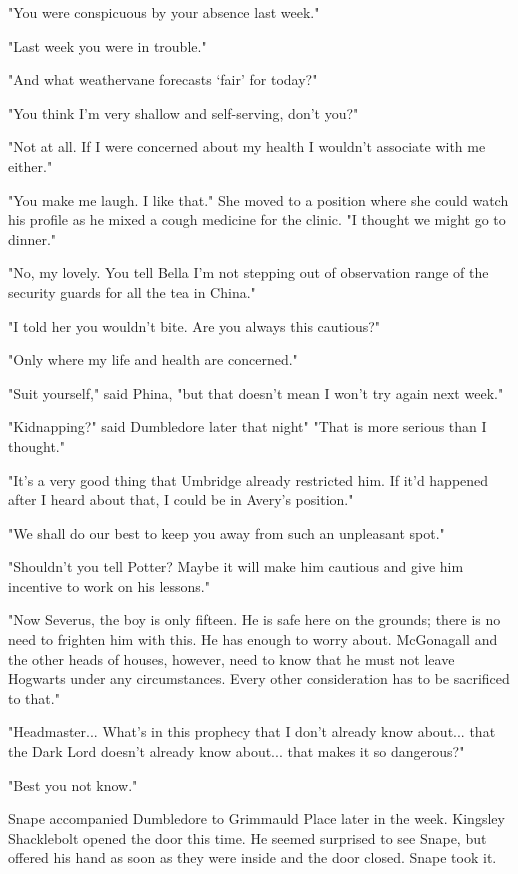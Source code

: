 \documentclass[a4paper,11pt]{article}
\begin{document}
"You were conspicuous by your absence last week."

"Last week you were in trouble."

"And what weathervane forecasts `fair' for today?"

"You think I'm very shallow and self-serving, don't you?"

"Not at all. If I were concerned about my health I wouldn't associate with me either."

"You make me laugh. I like that." She moved to a position where she could watch his profile as he mixed a cough medicine for the clinic. "I thought we might go to dinner."

"No, my lovely. You tell Bella I'm not stepping out of observation range of the security guards for all the tea in China."

"I told her you wouldn't bite. Are you always this cautious?"

"Only where my life and health are concerned."

"Suit yourself," said Phina, "but that doesn't mean I won't try again next week."

"Kidnapping?" said Dumbledore later that night" "That is more serious than I thought."

"It's a very good thing that Umbridge already restricted him. If it'd happened after I heard about that, I could be in Avery's position."

"We shall do our best to keep you away from such an unpleasant spot."

"Shouldn't you tell Potter? Maybe it will make him cautious and give him incentive to work on his lessons."

"Now Severus, the boy is only fifteen. He is safe here on the grounds; there is no need to frighten him with this. He has enough to worry about. McGonagall and the other heads of houses, however, need to know that he must not leave Hogwarts under any circumstances. Every other consideration has to be sacrificed to that."

"Headmaster... What's in this prophecy that I don't already know about... that the Dark Lord doesn't already know about... that makes it so dangerous?"

"Best you not know."

Snape accompanied Dumbledore to Grimmauld Place later in the week. Kingsley Shacklebolt opened the door this time. He seemed surprised to see Snape, but offered his hand as soon as they were inside and the door closed. Snape took it.
\end{document}
